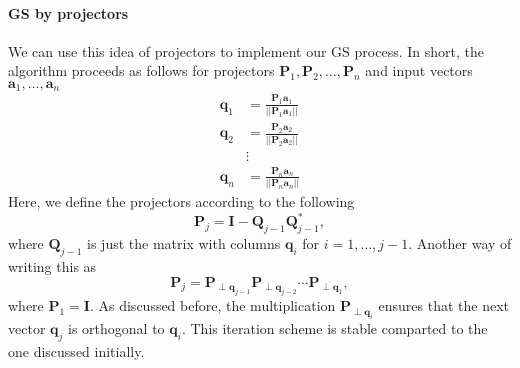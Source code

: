 \documentclass[12pt]{article}
\newcommand{\norm}[1]{ \left|\left| #1 \right|\right| }
\renewcommand{\vec}[1]{\mathbf{#1}}
\theoremstyle{definition}
\theoremstyle{remark}
\numberwithin{equation}{section}
\begin{document}
\paragraph{GS by projectors}%
\label{par:gs_by_projectors}

We can use this idea of projectors to implement our GS process. In short, the algorithm proceeds as follows for projectors $\vec{P}_1, \vec{P}_2, \ldots, \vec{P}_n$ and input vectors $\vec{a}_1, \ldots, \vec{a}_n$
\begin{align}
  \vec{q}_1 &= \frac{\vec{P}_1 \vec{a}_1}{\norm{\vec{P}_1 \vec{a}_1}} \\
  \vec{q}_2 &= \frac{\vec{P}_2 \vec{a}_2}{\norm{\vec{P}_2 \vec{a}_2}} \\
            &\vdots\\
  \vec{q}_n &= \frac{\vec{P}_n \vec{a}_n}{\norm{\vec{P}_n \vec{a}_n}}
\end{align}
Here, we define the projectors according to the following 
\begin{equation}
  \vec{P}_j = \vec{I} - \vec{Q}_{j-1}\vec{Q}_{j-1}^*,
\end{equation}
where $\vec{Q}_{j-1}$ is just the matrix with columns $\vec{q}_i$ for $i = 1, \ldots, j-1$. Another way of writing this as 
\begin{equation}
  \vec{P}_j = \vec{P}_{\perp\vec{q}_{j-1}}\vec{P}_{\perp\vec{q}_{j-2}} \cdots \vec{P}_{\perp\vec{q}_{1}},
\end{equation}
where $\vec{P}_1 = \vec{I}$. As discussed before, the multiplication $\vec{P}_{\perp\vec{q}_i}$ ensures that the next vector $\vec{q}_j$ is orthogonal to $\vec{q}_i$. This iteration scheme is stable comparted to the one discussed initially.
\end{document}
